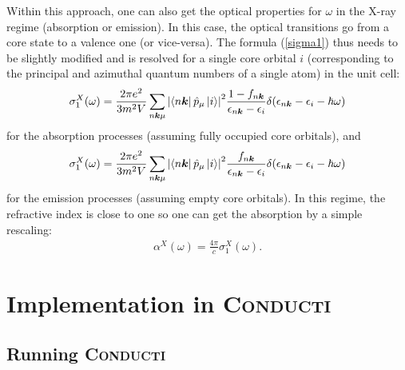 \documentclass[a4,12pts]{extarticle}
\begin{document}
Within this approach, one can also get the optical properties for $\omega$ in the X-ray regime (absorption or emission). In this case, the optical transitions go from a core state to a valence one (or vice-versa). The formula (\ref{sigma1}) thus needs to be slightly modified and is resolved for a single core orbital $i$ (corresponding to the principal and azimuthal quantum numbers of a single atom) in the unit cell:
\begin{align}
\sigma^{X}_1(\omega)=\frac{2\pi e^{2}}{3m^{2}V}\sum_{n\boldsymbol{k}\mu}\abs{\bra{n\boldsymbol{k}}\hat{p}_{\mu}\ket{i}}^2
\frac{1-f_{n\boldsymbol{k}}}{\epsilon_{n\boldsymbol{k}}-\epsilon_{i}}\delta(\epsilon_{n\boldsymbol{k}}-\epsilon_{i}-\hbar\omega) \label{sigX}
\end{align}
for the absorption processes (assuming fully occupied core orbitals), and
\begin{align}
\sigma^{X}_1(\omega)=\frac{2\pi e^{2}}{3m^{2}V}\sum_{n\boldsymbol{k}\mu}\abs{\bra{n\boldsymbol{k}}\hat{p}_{\mu}\ket{i}}^2
\frac{f_{n\boldsymbol{k}}}{\epsilon_{n\boldsymbol{k}}-\epsilon_{i}}\delta(\epsilon_{n\boldsymbol{k}}-\epsilon_{i}-\hbar\omega) \label{emisX}
\end{align}
for the emission processes (assuming empty core orbitals). In this regime, the refractive index is close to one so one can get the absorption by a simple rescaling:
\begin{align}
\alpha^{X}(\omega)=\frac{4\pi}{c}\sigma^{X}_1(\omega). \label{absX}
\end{align}


\newpage
\section{Implementation in \textsc{\textmd{Conducti}}}

\subsection{Running \textsc{\textmd{Conducti}}}
\end{document}
